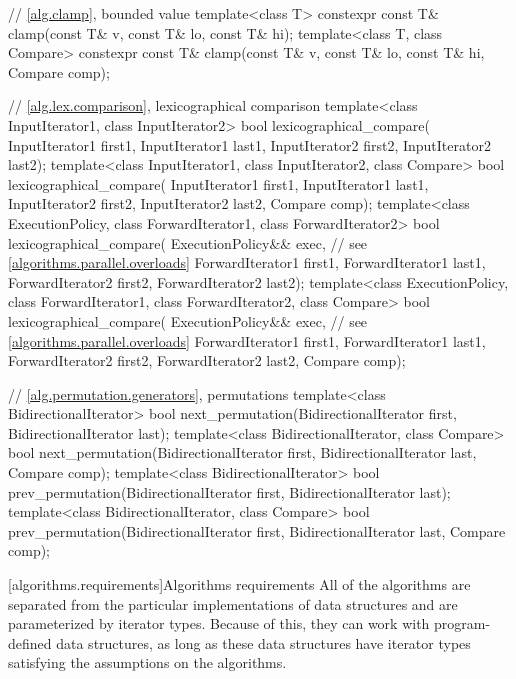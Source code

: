 \begin{codeblock}
{  // \ref{alg.clamp}, bounded value
  template<class T>
    constexpr const T& clamp(const T& v, const T& lo, const T& hi);
  template<class T, class Compare>
    constexpr const T& clamp(const T& v, const T& lo, const T& hi, Compare comp);

  // \ref{alg.lex.comparison}, lexicographical comparison
  template<class InputIterator1, class InputIterator2>
    bool lexicographical_compare(
      InputIterator1 first1, InputIterator1 last1,
      InputIterator2 first2, InputIterator2 last2);
  template<class InputIterator1, class InputIterator2, class Compare>
    bool lexicographical_compare(
      InputIterator1 first1, InputIterator1 last1,
      InputIterator2 first2, InputIterator2 last2,
      Compare comp);
  template<class ExecutionPolicy, class ForwardIterator1, class ForwardIterator2>
    bool lexicographical_compare(
      ExecutionPolicy&& exec, // see \ref{algorithms.parallel.overloads}
      ForwardIterator1 first1, ForwardIterator1 last1,
      ForwardIterator2 first2, ForwardIterator2 last2);
  template<class ExecutionPolicy, class ForwardIterator1, class ForwardIterator2,
           class Compare>
    bool lexicographical_compare(
      ExecutionPolicy&& exec, // see \ref{algorithms.parallel.overloads}
      ForwardIterator1 first1, ForwardIterator1 last1,
      ForwardIterator2 first2, ForwardIterator2 last2,
      Compare comp);

  // \ref{alg.permutation.generators}, permutations
  template<class BidirectionalIterator>
    bool next_permutation(BidirectionalIterator first,
                          BidirectionalIterator last);
  template<class BidirectionalIterator, class Compare>
    bool next_permutation(BidirectionalIterator first,
                          BidirectionalIterator last, Compare comp);
  template<class BidirectionalIterator>
    bool prev_permutation(BidirectionalIterator first,
                          BidirectionalIterator last);
  template<class BidirectionalIterator, class Compare>
    bool prev_permutation(BidirectionalIterator first,
                          BidirectionalIterator last, Compare comp);
}
\end{codeblock}

[algorithms.requirements]{Algorithms requirements}
\pnum
All of the algorithms are separated from the particular implementations of data structures and are
parameterized by iterator types.
Because of this, they can work with program-defined data structures, as long
as these data structures have iterator types satisfying the assumptions on the algorithms.

